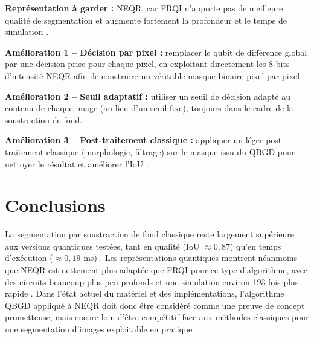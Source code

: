 \documentclass[12pt,a4paper]{report}
\begin{document}
	\textbf{Représentation à garder :} NEQR, car FRQI n'apporte pas de meilleure qualité de segmentation et augmente fortement la profondeur et le temps de simulation \cite{zhang2013neqr,li2010frqi,iliyasuhybrid2013,yao2017qipreview}.
	
	\textbf{Amélioration 1 – Décision par pixel :} remplacer le qubit de différence global par une décision prise pour chaque pixel, en exploitant directement les 8 bits d'intensité NEQR afin de construire un véritable masque binaire pixel-par-pixel.
	
	\textbf{Amélioration 2 – Seuil adaptatif :} utiliser un seuil de décision adapté au contenu de chaque image (au lieu d'un seuil fixe), toujours dans le cadre de la soustraction de fond.
	
	\textbf{Amélioration 3 – Post-traitement classique :} appliquer un léger post-traitement classique (morphologie, filtrage) sur le masque issu du QBGD pour nettoyer le résultat et améliorer l'IoU \cite{iliyasuhybrid2013,yuan2016sqr}.
	
	\section{Conclusions}
	
	La segmentation par soustraction de fond classique reste largement supérieure aux versions quantiques testées, tant en qualité (IoU \(\approx 0{,}87\)) qu'en temps d'exécution (\(\approx 0{,}19\) ms) \cite{stauffer1999}. Les représentations quantiques montrent néanmoins que NEQR est nettement plus adaptée que FRQI pour ce type d'algorithme, avec des circuits beaucoup plus peu profonds et une simulation environ 193 fois plus rapide \cite{zhang2013neqr,li2010frqi,yao2017qipreview}. Dans l'état actuel du matériel et des implémentations, l'algorithme QBGD appliqué à NEQR doit donc être considéré comme une preuve de concept prometteuse, mais encore loin d'être compétitif face aux méthodes classiques pour une segmentation d'images exploitable en pratique \cite{wang2023qbgd,iliyasuhybrid2013}.
	
	
	
	
	
\end{document}
